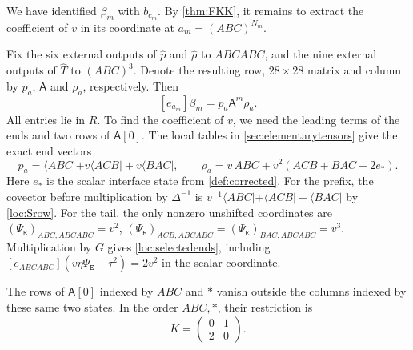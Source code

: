 \documentclass[a4paper,11pt]{amsart}
\newcommand{\wordend}{\mathtt{E}}
\newcommand{\finishmap}{{\Psi}_{{\wordend}}}
\newcommand{\tpar}{v}
\numberwithin{equation}{subsection}
\theoremstyle{plain}
\theoremstyle{definition}
\theoremstyle{remark}
\begin{document}
We have identified $\beta_m$ with $b_{c_m}$. By \autoref{thm:FKK},
it remains to extract the coefficient of $\tpar$ in its coordinate at
$a_m=(ABC)^{N_m}$.

Fix the six external outputs of $\widehat p$ and $\widehat\rho$ to
$ABCABC$, and the nine external outputs of $\widehat T$ to $(ABC)^3$.
Denote the resulting row, $28\times28$ matrix and column by $p_a$,
$\mathsf A$ and $\rho_a$, respectively. Then
\[
[e_{a_m}]\beta_m=p_a \mathsf A^m \rho_a.
\]
All entries lie in $R$. To find the coefficient of $\tpar$, we need the
leading terms of the ends and two rows of $\mathsf A[0]$.
The local tables in \autoref{sec:elementarytensors} give the exact end vectors
\begin{equation}\label{loc:selectedends}
p_a=\langle ABC|+\tpar\langle ACB|+\tpar\langle BAC|,
\qquad
\rho_a=\tpar\,ABC+\tpar^2(ACB+BAC+2e_*).
\end{equation}
Here $e_*$ is the scalar interface state from \autoref{def:corrected}.
For the prefix, the covector before multiplication by $\Delta^{-1}$ is
$\tpar^{-1}\langle ABC|+\langle ACB|+\langle BAC|$ by \autoref{loc:Srow}.
For the tail, the only nonzero unshifted coordinates are
$(\finishmap)_{ABC,ABCABC}=\tpar^2$, $(\finishmap)_{ACB,ABCABC}=(\finishmap)_{BAC,ABCABC}=\tpar^3$. Multiplication by $G$ gives
\autoref{loc:selectedends}, including $[e_{ABCABC}](\tpar\eta \finishmap-\tau^2)=2\tpar^2$ in the scalar
coordinate.

\begin{lemma}\label{loc:tworows}
The rows of $\mathsf A[0]$ indexed by $ABC$ and $*$ vanish outside
the columns indexed by these same two states. In the order $ABC,*$,
their restriction is
\[
K=\begin{pmatrix}0&1\\2&0\end{pmatrix}.
\]
\end{lemma}
\end{document}
